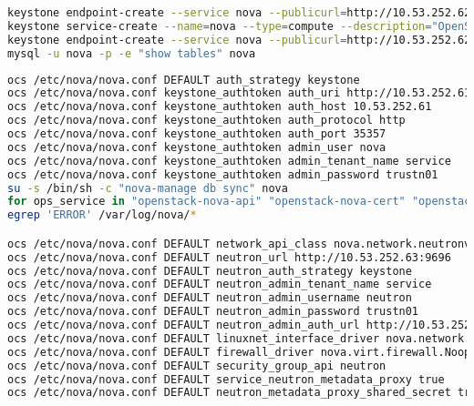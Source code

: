 \documentclass[11pt,letterpaper,oneside]{book}
\begin{document}
\begin{lstlisting}[caption={virctlpaw001},language=bash]
keystone endpoint-create --service nova --publicurl=http://10.53.252.62:8774/v2/%\(tenant_id\)s --internalurl=http://10.53.252.62:8774/v2/%\(tenant_id\)s --adminurl=http://10.53.252.62:8774/v2/%\(tenant_id\)s
keystone service-create --name=nova --type=compute --description="OpenStack Compute"
keystone endpoint-create --service nova --publicurl=http://10.53.252.62:8774/v2/%\(tenant_id\)s --internalurl=http://10.53.252.62:8774/v2/%\(tenant_id\)s --adminurl=http://10.53.252.62:8774/v2/%\(tenant_id\)s
mysql -u nova -p -e "show tables" nova

\end{lstlisting}

\begin{lstlisting}[caption={virctlpaw002},language=bash]
ocs /etc/nova/nova.conf DEFAULT auth_strategy keystone
ocs /etc/nova/nova.conf keystone_authtoken auth_uri http://10.53.252.61:5000
ocs /etc/nova/nova.conf keystone_authtoken auth_host 10.53.252.61
ocs /etc/nova/nova.conf keystone_authtoken auth_protocol http
ocs /etc/nova/nova.conf keystone_authtoken auth_port 35357
ocs /etc/nova/nova.conf keystone_authtoken admin_user nova
ocs /etc/nova/nova.conf keystone_authtoken admin_tenant_name service
ocs /etc/nova/nova.conf keystone_authtoken admin_password trustn01
su -s /bin/sh -c "nova-manage db sync" nova
for ops_service in "openstack-nova-api" "openstack-nova-cert" "openstack-nova-consoleauth" "openstack-nova-scheduler" "openstack-nova-conductor" "openstack-nova-novncproxy"; do systemctl enable $ops_service; systemctl start $ops_service; done
egrep 'ERROR' /var/log/nova/*

ocs /etc/nova/nova.conf DEFAULT network_api_class nova.network.neutronv2.api.API
ocs /etc/nova/nova.conf DEFAULT neutron_url http://10.53.252.63:9696
ocs /etc/nova/nova.conf DEFAULT neutron_auth_strategy keystone
ocs /etc/nova/nova.conf DEFAULT neutron_admin_tenant_name service
ocs /etc/nova/nova.conf DEFAULT neutron_admin_username neutron
ocs /etc/nova/nova.conf DEFAULT neutron_admin_password trustn01
ocs /etc/nova/nova.conf DEFAULT neutron_admin_auth_url http://10.53.252.61:35357/v2.0
ocs /etc/nova/nova.conf DEFAULT linuxnet_interface_driver nova.network.linux_net.LinuxOVSInterfaceDriver
ocs /etc/nova/nova.conf DEFAULT firewall_driver nova.virt.firewall.NoopFirewallDriver
ocs /etc/nova/nova.conf DEFAULT security_group_api neutron
ocs /etc/nova/nova.conf DEFAULT service_neutron_metadata_proxy true
ocs /etc/nova/nova.conf DEFAULT neutron_metadata_proxy_shared_secret trustn01


\end{lstlisting}
\end{document}
